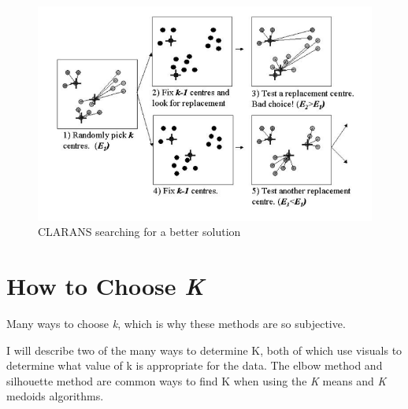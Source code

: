 \documentclass[12pt,twoside]{amherstthesis}
\begin{document}
  \begin{Shaded}
  \begin{Highlighting}[]
  
  \NormalTok{(} \NormalTok{, }
         \NormalTok{, }
         \NormalTok{, } \NormalTok{, } \NormalTok{)}
  \end{Highlighting}
  \end{Shaded}
  
  \begin{figure}[htbp]
  \centering
  \includegraphics[scale = 0.5,angle = 0]{clustering_pic.png}
  \caption[CLARANS searching for a better solution]{\normalsize{CLARANS searching for a better solution}}
  \label{fig:CLARANS}
  \end{figure}
  
  \section{\texorpdfstring{How to Choose
  \emph{K}}{How to Choose K}}\label{how-to-choose-k}
  
  Many ways to choose \emph{k}, which is why these methods are so
  subjective.
  
  I will describe two of the many ways to determine K, both of which use
  visuals to determine what value of k is appropriate for the data. The
  elbow method and silhouette method are common ways to find K when using
  the \emph{K} means and \emph{K} medoids algorithms.
  
\end{document}
